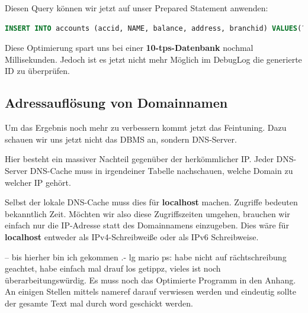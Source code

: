Diesen Query können wir jetzt auf unser Prepared Statement anwenden:
\begin{lstlisting}[language=sql]
INSERT INTO accounts (accid, NAME, balance, address, branchid) VALUES(?, 'account', 0,'test', trunc(random() * n + 1))
\end{lstlisting}

Diese Optimierung spart uns bei einer  \textbf{10-tps-Datenbank} nochmal  Millisekunden. Jedoch ist es jetzt nicht mehr Möglich im DebugLog die
generierte ID zu überprüfen.


\subsection{Adressauflösung von Domainnamen}
Um das Ergebnis noch mehr zu verbessern kommt jetzt das Feintuning. Dazu
schauen wir uns jetzt nicht das DBMS an, sondern DNS-Server.

Hier besteht ein massiver Nachteil gegenüber der herkömmlicher IP. Jeder
DNS-Server \bzw DNS-Cache muss in irgendeiner Tabelle nachschauen, welche Domain
zu welcher IP gehört. 

Selbst der lokale DNS-Cache muss dies \zB für \textbf{localhost} machen.
Zugriffe bedeuten bekanntlich Zeit. Möchten wir also diese Zugriffszeiten
umgehen, brauchen wir einfach nur die IP-Adresse statt des Domainnamens
einzugeben. Dies wäre für \textbf{localhost} entweder  als
IPv4-Schreibweiße oder \gqq{[::1]} als IPv6 Schreibweise.

-- bis hierher bin ich gekommen .- lg mario
ps: habe nicht auf rächtschreibung geachtet, habe einfach mal drauf los getippz,
vieles ist noch überarbeitungswürdig. Es muss noch das Optimierte Programm in
den Anhang. An einigen Stellen mittels nameref darauf verwiesen werden und
eindeutig sollte der gesamte Text mal durch word geschickt werden.
\clearpage